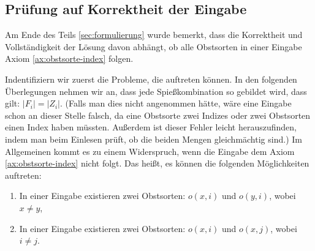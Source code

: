 \subsection{Prüfung auf Korrektheit der Eingabe}\label{sec:korrektheit-eingabe}
Am Ende des Teils \ref{sec:formulierung} wurde bemerkt, dass die Korrektheit und Vollständigkeit
der Lösung davon abhängt, ob alle Obstsorten in einer Eingabe Axiom \ref{ax:obstsorte-index} folgen.

Indentifiziern wir zuerst die Probleme, die auftreten können.
In den folgenden Überlegungen nehmen wir an, dass jede Spießkombination so gebildet wird, dass gilt: $|F_i| = |Z_i|$.
(Falls man dies nicht angenommen hätte, wäre eine Eingabe schon an dieser Stelle
falsch, da eine Obstsorte zwei Indizes oder zwei Obstsorten einen Index haben müssten.
Außerdem ist dieser Fehler leicht herauszufinden, indem man beim Einlesen prüft,
ob die beiden Mengen gleichmächtig sind.)
Im Allgemeinen kommt es zu einem Widerspruch, wenn die Eingabe
dem Axiom \ref{ax:obstsorte-index} nicht folgt. 
Das heißt, es können die folgenden 
Möglichkeiten auftreten:
\begin{enumerate}[label={(P\arabic*)}]
  \item In einer Eingabe existieren zwei Obstsorten: $o(x, i)$ und $o(y, i)$, wobei $x \neq y$,\label{probleme1}
  \item In einer Eingabe existieren zwei Obstsorten: $o(x, i)$ und $o(x, j)$, wobei $i \neq j$.\label{probleme2}
\end{enumerate}

